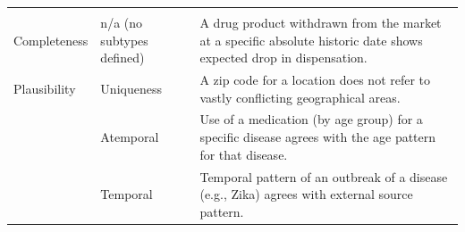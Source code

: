\documentclass[11pt]{book}
\begin{document}
\begin{longtable}[]{@{}lll@{}}
\begin{minipage}[t]{0.67\columnwidth}
\end{minipage}\tabularnewline
\begin{minipage}[t]{0.09\columnwidth}\raggedright\strut
Completeness\strut
\end{minipage} & \begin{minipage}[t]{0.16\columnwidth}\raggedright\strut
n/a (no subtypes defined)\strut
\end{minipage} & \begin{minipage}[t]{0.67\columnwidth}\raggedright\strut
A drug product withdrawn from the market at a specific absolute historic
date shows expected drop in dispensation.\strut
\end{minipage}\tabularnewline
\begin{minipage}[t]{0.09\columnwidth}\raggedright\strut
Plausibility\strut
\end{minipage} & \begin{minipage}[t]{0.16\columnwidth}\raggedright\strut
Uniqueness\strut
\end{minipage} & \begin{minipage}[t]{0.67\columnwidth}\raggedright\strut
A zip code for a location does not refer to vastly conflicting
geographical areas.\strut
\end{minipage}\tabularnewline
\begin{minipage}[t]{0.09\columnwidth}\raggedright\strut
\strut
\end{minipage} & \begin{minipage}[t]{0.16\columnwidth}\raggedright\strut
Atemporal\strut
\end{minipage} & \begin{minipage}[t]{0.67\columnwidth}\raggedright\strut
Use of a medication (by age group) for a specific disease agrees with
the age pattern for that disease.\strut
\end{minipage}\tabularnewline
\begin{minipage}[t]{0.09\columnwidth}\raggedright\strut
\strut
\end{minipage} & \begin{minipage}[t]{0.16\columnwidth}\raggedright\strut
Temporal\strut
\end{minipage} & \begin{minipage}[t]{0.67\columnwidth}\raggedright\strut
Temporal pattern of an outbreak of a disease (e.g., Zika) agrees with
external source pattern.\strut
\end{minipage}\tabularnewline
\bottomrule
\end{longtable}
\end{document}
